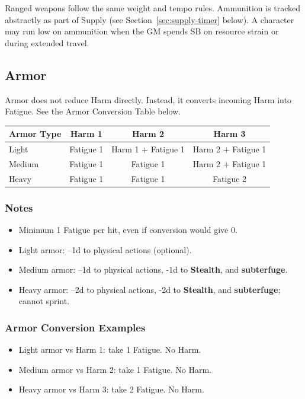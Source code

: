 Ranged weapons follow the same weight and tempo rules. Ammunition is tracked abstractly as part of Supply (see Section~\ref{sec:supply-timer} below). A character may run low on ammunition when the GM spends SB on resource strain or during extended travel.

\subsection{Armor}

Armor does not reduce Harm directly. Instead, it converts incoming Harm into Fatigue. See the Armor Conversion Table below.

\begin{tabular}{@{}lccc@{}}
\toprule
\textbf{Armor Type} & \textbf{Harm 1} & \textbf{Harm 2} & \textbf{Harm 3} \\
\midrule
Light   & Fatigue 1 & Harm 1 + Fatigue 1 & Harm 2 + Fatigue 1 \\
Medium  & Fatigue 1 & Fatigue 1 & Harm 2 + Fatigue 1 \\
Heavy   & Fatigue 1 & Fatigue 1 & Fatigue 2 \\
\bottomrule
\end{tabular}

\subsubsection{Notes}
\begin{itemize}
  \item Minimum 1 Fatigue per hit, even if conversion would give 0.
  \item Light armor: --1d to physical actions (optional).
  \item Medium armor: --1d to physical actions, -1d to \textbf{Stealth}, and \textbf{subterfuge}.
  \item Heavy armor: --2d to physical actions, -2d to \textbf{Stealth}, and \textbf{subterfuge}; cannot sprint.
\end{itemize}

\subsubsection{Armor Conversion Examples}
\begin{itemize}
  \item Light armor vs Harm 1: take 1 Fatigue. No Harm.
  \item Medium armor vs Harm 2: take 1 Fatigue. No Harm.
  \item Heavy armor vs Harm 3: take 2 Fatigue. No Harm.
\end{itemize}

